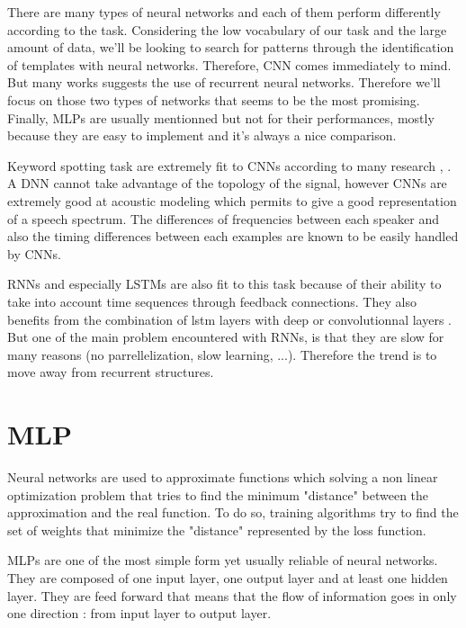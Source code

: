 There are many types of neural networks and each of them perform differently according to the task. Considering the low vocabulary of our task and the large amount of data, we'll be looking to search for patterns through the identification of templates with neural networks. Therefore, CNN comes immediately to mind. But many works suggests the use of recurrent neural networks. Therefore we'll focus on those two types of networks that seems to be the most promising. Finally, MLPs are usually mentionned but not for their performances, mostly because they are easy to implement and it's always a nice comparison.

\vspace{5mm}

Keyword spotting task are extremely fit to CNNs according to many research \cite{CNN}, \cite{init}. A DNN cannot take advantage of the topology of the signal, however CNNs are extremely good at acoustic modeling which permits to give a good representation of a speech spectrum. The differences of frequencies between each speaker and also the timing differences between each examples are known to be easily handled by CNNs.

\vspace{5mm}

RNNs and especially LSTMs are also fit to this task because of their ability to take into account time sequences through feedback connections. They also benefits from the combination of lstm layers with deep or convolutionnal layers \cite{graves}. But one of the main problem encountered with RNNs, is that they are slow for many reasons (no parrellelization, slow learning, ...). Therefore the trend is to move away from recurrent structures.



\section{MLP}

Neural networks are used to approximate functions which solving a non linear optimization problem that tries to find the minimum "distance" between the approximation and the real function. To do so, training algorithms try to find the set of weights that minimize the "distance" represented by the loss function.

\vspace{5mm}

MLPs are one of the most simple form yet usually reliable of neural networks. They are composed of one input layer, one output layer and at least one hidden layer. They are feed forward that means that the flow of information goes in only one direction : from input layer to output layer.


